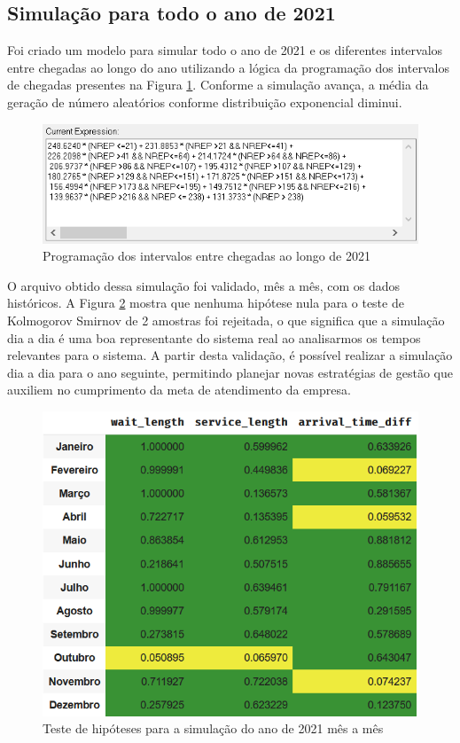 \subsection{Simulação para todo o ano de 2021}
\label{section: sim-2021}
Foi criado um modelo para simular todo o ano de 2021 e os diferentes intervalos entre chegadas ao longo do ano utilizando a lógica da programação dos intervalos de chegadas presentes na Figura \ref*{fig: logica-2021}. Conforme a simulação avança, a média da geração de número aleatórios conforme distribuição exponencial diminui.

\begin{figure}[H]
    \centering
    \includegraphics[scale=1.2]{simulacao/logica-2021.png}
    \caption{Programação dos intervalos entre chegadas ao longo de 2021}
    \label{fig: logica-2021}
\end{figure}

O arquivo obtido dessa simulação foi validado, mês a mês, com os dados históricos. A Figura \ref*{fig: validacao-sim-2021} mostra que nenhuma hipótese nula para o teste de Kolmogorov Smirnov de 2 amostras foi rejeitada, o que significa que a simulação dia a dia é uma boa representante do sistema real ao analisarmos os tempos relevantes para o sistema. A partir desta validação, é possível realizar a simulação dia a dia para o ano seguinte, permitindo planejar novas estratégias de gestão que auxiliem no cumprimento da meta de atendimento da empresa.

\begin{figure}[H]
    \centering
    \includegraphics[scale=1]{simulacao/validacao-sim-2021.png}
    \caption{Teste de hipóteses para a simulação do ano de 2021 mês a mês}
    \label{fig: validacao-sim-2021}
\end{figure}
